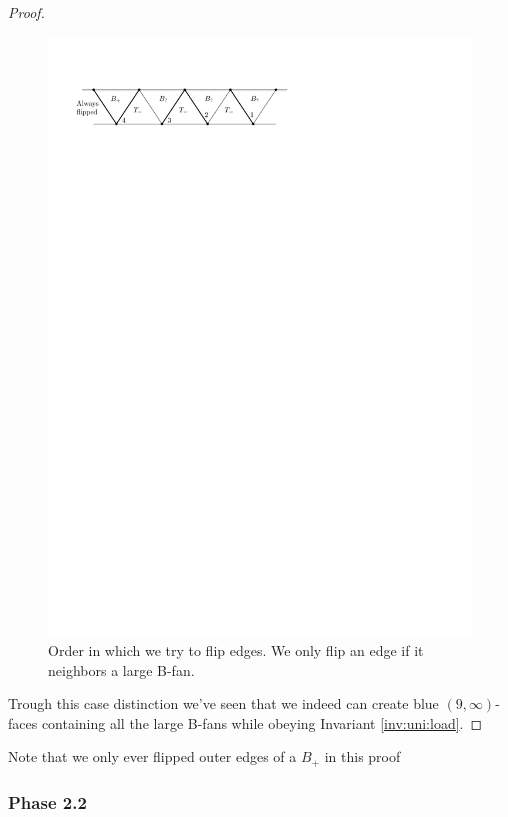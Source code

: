 \begin{proof}
  \begin{figure}[h]
    \centering
    \includegraphics[scale=1]{unifiedAlgo/img/placeEdges}
    \caption{Order in which we try to flip edges. We only flip an edge if it neighbors a large B-fan.}
    \label{fig:uni:placeedges}
  \end{figure}

  Trough this case distinction we've seen that we indeed can create blue $(9,\infty)$-faces containing all the large B-fans while obeying Invariant \ref{inv:uni:load}.

\end{proof}

  Note that we only ever flipped outer edges of a $B_+$ in this proof


\subsubsection{Phase 2.2}

